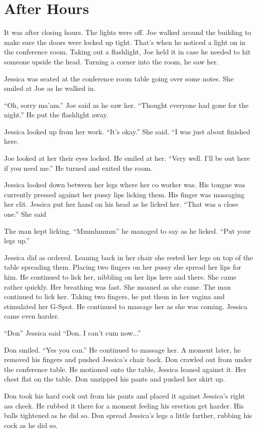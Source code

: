 \section{After Hours}

It was after closing hours. The lights were off. Joe walked around the building to make sure the doors were locked up tight. That’s when he noticed a light on in the conference room. Taking out a flashlight, Joe held it in case he needed to hit someone upside the head. Turning a corner into the room, he saw her.

Jessica was seated at the conference room table going over some notes. She smiled at Joe as he walked in.

“Oh, sorry ma’am.” Joe said as he saw her. “Thought everyone had gone for the night.” He put the flashlight away.

Jessica looked up from her work. “It’s okay.” She said. “I was just about finished here.

Joe looked at her their eyes locked. He smiled at her. “Very well. I’ll be out here if you need me.” He turned and exited the room.

Jessica looked down between her legs where her co worker was. His tongue was currently pressed against her pussy lips licking them. His finger was massaging her clit. Jessica put her hand on his head as he licked her. “That was a close one.” She said

The man kept licking. “Mmmhmmm” he managed to say as he licked. “Put your legs up.”

Jessica did as ordered. Leaning back in her chair she rested her legs on top of the table spreading them. Placing two fingers on her pussy she spread her lips for him. He continued to lick her, nibbling on her lips here and there. She came rather quickly. Her breathing was fast. She moaned as she came. The man continued to lick her. Taking two fingers, he put them in her vagina and stimulated her G-Spot. He continued to massage her as she was coming. Jessica came even harder.

“Don” Jessica said “Don, I can’t cum now...”

Don smiled. “Yes you can.” He continued to massage her. A moment later, he removed his fingers and pushed Jessica’s chair back. Don crawled out from under the conference table. He motioned onto the table, Jessica leaned against it. Her chest flat on the table. Don unzipped his pants and pushed her skirt up.

Don took his hard cock out from his pants and placed it against Jessica’s right ass cheek. He rubbed it there for a moment feeling his erection get harder. His balls tightened as he did so. Don spread Jessica’s legs a little farther, rubbing his cock as he did so.

